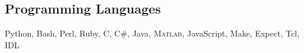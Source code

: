
\subsection{Programming Languages}

Python, Bash, Perl, Ruby, C, C\#, Java, \textsc{Matlab}, JavaScript, Make, Expect, Tcl, IDL
